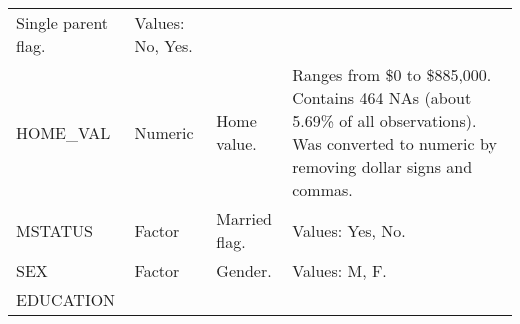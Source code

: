 \documentclass[]{article}
\begin{document}
\begin{longtable}[]{@{}llll@{}}
\begin{minipage}[t]{0.28\columnwidth}
Single parent flag.\strut
\end{minipage} & \begin{minipage}[t]{0.28\columnwidth}\raggedright\strut
Values: No, Yes.\strut
\end{minipage}\tabularnewline
\begin{minipage}[t]{0.16\columnwidth}\raggedright\strut
HOME\_VAL\strut
\end{minipage} & \begin{minipage}[t]{0.12\columnwidth}\raggedright\strut
Numeric\strut
\end{minipage} & \begin{minipage}[t]{0.28\columnwidth}\raggedright\strut
Home value.\strut
\end{minipage} & \begin{minipage}[t]{0.28\columnwidth}\raggedright\strut
Ranges from \$0 to \$885,000. Contains 464 NAs (about 5.69\% of all
observations). Was converted to numeric by removing dollar signs and
commas.\strut
\end{minipage}\tabularnewline
\begin{minipage}[t]{0.16\columnwidth}\raggedright\strut
MSTATUS\strut
\end{minipage} & \begin{minipage}[t]{0.12\columnwidth}\raggedright\strut
Factor\strut
\end{minipage} & \begin{minipage}[t]{0.28\columnwidth}\raggedright\strut
Married flag.\strut
\end{minipage} & \begin{minipage}[t]{0.28\columnwidth}\raggedright\strut
Values: Yes, No.\strut
\end{minipage}\tabularnewline
\begin{minipage}[t]{0.16\columnwidth}\raggedright\strut
SEX\strut
\end{minipage} & \begin{minipage}[t]{0.12\columnwidth}\raggedright\strut
Factor\strut
\end{minipage} & \begin{minipage}[t]{0.28\columnwidth}\raggedright\strut
Gender.\strut
\end{minipage} & \begin{minipage}[t]{0.28\columnwidth}\raggedright\strut
Values: M, F.\strut
\end{minipage}\tabularnewline
\begin{minipage}[t]{0.16\columnwidth}\raggedright\strut
EDUCATION\strut
\end{minipage} & \begin{minipage}[t]{0.12\columnwidth}\raggedright\strut

\end{minipage}
\end{longtable}
\end{document}

